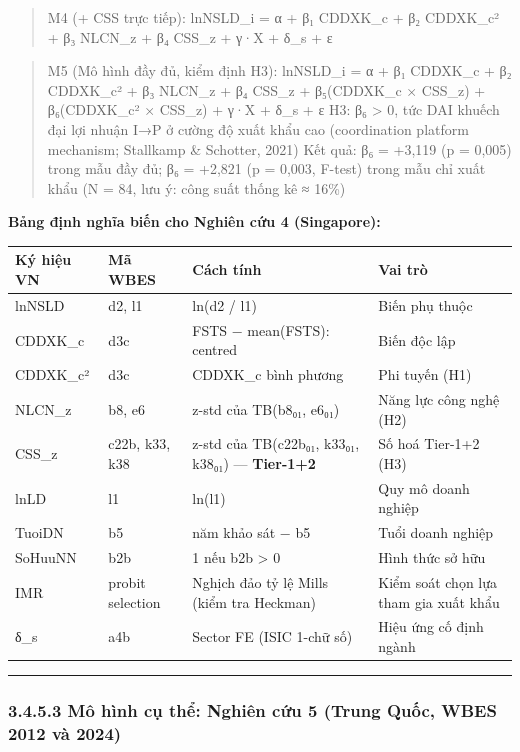 \documentclass[12pt,a4paper]{article}
\begin{document}
\begin{quote}
M4 (+ CSS trực tiếp): lnNSLD\_i = α + β₁ CDDXK\_c + β₂ CDDXK\_c² + β₃
NLCN\_z + β₄ CSS\_z + γ·X + δ\_s + ε
\end{quote}

\begin{quote}
M5 (Mô hình đầy đủ, kiểm định H3): lnNSLD\_i = α + β₁ CDDXK\_c + β₂
CDDXK\_c² + β₃ NLCN\_z + β₄ CSS\_z + β₅(CDDXK\_c × CSS\_z) +
β₆(CDDXK\_c² × CSS\_z) + γ·X + δ\_s + ε H3: β₆ \textgreater{} 0, tức DAI
khuếch đại lợi nhuận I→P ở cường độ xuất khẩu cao (coordination platform
mechanism; Stallkamp \& Schotter, 2021) Kết quả: β₆ = +3,119 (p = 0,005)
trong mẫu đầy đủ; β₆ = +2,821 (p = 0,003, F-test) trong mẫu chỉ xuất
khẩu (N = 84, lưu ý: công suất thống kê ≈ 16\%)
\end{quote}

\textbf{Bảng định nghĩa biến cho Nghiên cứu 4 (Singapore):}

\begin{longtable}[]{@{}llll@{}}
\toprule\noalign{}
Ký hiệu VN & Mã WBES & Cách tính & Vai trò \\
\midrule\noalign{}
\endhead
\bottomrule\noalign{}
\endlastfoot
lnNSLD & d2, l1 & ln(d2 / l1) & Biến phụ thuộc \\
CDDXK\_c & d3c & FSTS − mean(FSTS): centred & Biến độc lập \\
CDDXK\_c² & d3c & CDDXK\_c bình phương & Phi tuyến (H1) \\
NLCN\_z & b8, e6 & z-std của TB(b8₀₁, e6₀₁) & Năng lực công nghệ (H2) \\
CSS\_z & c22b, k33, k38 & z-std của TB(c22b₀₁, k33₀₁, k38₀₁) ---
\textbf{Tier-1+2} & Số hoá Tier-1+2 (H3) \\
lnLD & l1 & ln(l1) & Quy mô doanh nghiệp \\
TuoiDN & b5 & năm khảo sát − b5 & Tuổi doanh nghiệp \\
SoHuuNN & b2b & 1 nếu b2b \textgreater{} 0 & Hình thức sở hữu \\
IMR & probit selection & Nghịch đảo tỷ lệ Mills (kiểm tra Heckman) &
Kiểm soát chọn lựa tham gia xuất khẩu \\
δ\_s & a4b & Sector FE (ISIC 1-chữ số) & Hiệu ứng cố định ngành \\
\end{longtable}

\begin{center}\rule{0.5\linewidth}{0.5pt}\end{center}

\hypertarget{3453-muxf4-huxecnh-cux1ee5-thux1ec3-nghiuxean-cux1ee9u-5-trung-quux1ed1c-wbes-2012-vuxe0-2024}{%
\subsubsection{3.4.5.3 Mô hình cụ thể: Nghiên cứu 5 (Trung Quốc, WBES
2012 và
2024)}\label{3453-muxf4-huxecnh-cux1ee5-thux1ec3-nghiuxean-cux1ee9u-5-trung-quux1ed1c-wbes-2012-vuxe0-2024}}
\end{document}
